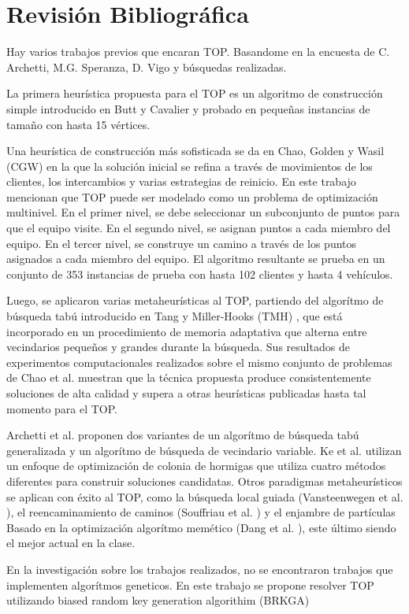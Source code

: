 
\chapter{Revisión Bibliográfica}

Hay varios trabajos previos que encaran TOP. Basandome en la encuesta de C. Archetti, M.G. Speranza, D. Vigo \cite{ArchettiSperanzaVigo} y búsquedas realizadas.

\bigskip

La primera heurística propuesta para el TOP es un algoritmo de construcción simple introducido en Butt y Cavalier \cite{ButtCavalier} y probado en pequeñas instancias de tamaño con hasta 15 vértices.

\bigskip

Una heurística de construcción más sofisticada se da en Chao, Golden y Wasil (CGW) \cite{ChaoGoldenWasil} en la que la solución inicial se refina a través de movimientos de los clientes, los intercambios y varias estrategias de reinicio. En este trabajo mencionan que TOP puede ser modelado como un problema de optimización multinivel. En el primer nivel, se debe seleccionar un subconjunto de puntos para que el equipo visite. En el segundo nivel, se asignan puntos a cada miembro del equipo. En el tercer nivel, se construye un camino a través de los puntos asignados a cada miembro del equipo. El algoritmo resultante se prueba en un conjunto de 353 instancias de prueba con hasta 102 clientes y hasta 4 vehículos.

\bigskip

Luego, se aplicaron varias metaheurísticas al TOP, partiendo del algorítmo de búsqueda tabú introducido en Tang y Miller-Hooks (TMH) \cite{TangMillerHooks}, que está incorporado en un procedimiento de memoria adaptativa que alterna entre vecindarios pequeños y grandes durante la búsqueda. Sus resultados de experimentos computacionales realizados sobre el mismo conjunto de problemas de Chao et al. muestran que la técnica propuesta produce consistentemente soluciones de alta calidad y supera a otras heurísticas publicadas hasta tal momento para el TOP.

\bigskip

Archetti et al. \cite{ArchettiHertzSperanza} proponen dos variantes de un algorítmo de búsqueda tabú generalizada y un algorítmo de búsqueda de vecindario variable. Ke et al. \cite{KeArchettiFeng} utilizan un enfoque de optimización de colonia de hormigas que utiliza cuatro métodos diferentes para construir soluciones candidatas. Otros paradigmas metaheurísticos se aplican con éxito al TOP, como la búsqueda local guiada (Vansteenwegen et al. \cite{Vansteenwegen} ), el reencaminamiento de caminos (Souffriau et al. \cite{Souffriau}) y el enjambre de partículas Basado en la optimización algorítmo memético (Dang et al. \cite{Dang}), este último siendo el mejor actual en la clase.

\bigskip

En la investigación sobre los trabajos realizados, no se encontraron trabajos que implementen algorítmos geneticos. En este trabajo se propone resolver TOP utilizando biased random key generation algorithim (BRKGA)










